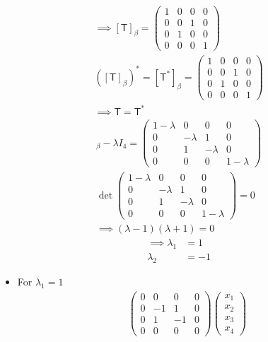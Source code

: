 \begin{enumerate}
\begin{gather}
\implies [\mathsf{T}]_\beta = \begin{pmatrix}
1 & 0 & 0 & 0\\
0 & 0 & 1 & 0\\
0 & 1 & 0 & 0\\
0 & 0 & 0 & 1
\end{pmatrix}\\
([\mathsf{T}]_\beta)^* = [\mathsf{T}^*]_\beta = \begin{pmatrix}
1 & 0 & 0 & 0\\
0 & 0 & 1 & 0\\
0 & 1 & 0 & 0\\
0 & 0 & 0 & 1
\end{pmatrix}\\
\implies \mathsf{T} = \mathsf{T}^*
\end{gather}
\begin{gather}
[\mathsf{T}]_\beta - \lambda I_4 = \begin{pmatrix}
1-\lambda & 0 & 0 & 0\\
0 & -\lambda & 1 & 0\\
0 & 1 & -\lambda & 0\\
0 & 0 & 0 & 1 -\lambda
  \end{pmatrix}\\
\det{
\begin{pmatrix}
1-\lambda & 0 & 0 & 0\\
0 & -\lambda & 1 & 0\\
0 & 1 & -\lambda & 0\\
0 & 0 & 0 & 1 -\lambda
  \end{pmatrix}
} = 0\\
\implies (\lambda -1)(\lambda +1) = 0
\end{gather}
\begin{align}
\implies \lambda_1 &=1\\
\lambda_2 &= -1
\end{align}
\begin{itemize}
\item For $\lambda_1 = 1$
\begin{gather}
\begin{pmatrix}
0 & 0 & 0  & 0\\
0 & -1 & 1 & 0\\
0 & 1 & -1 & 0\\
0 & 0 & 0 & 0
\end{pmatrix}
\begin{pmatrix}
x_1\\x_2\\x_3\\x_4

\end{pmatrix}
\end{gather}
\end{itemize}
\end{enumerate}
